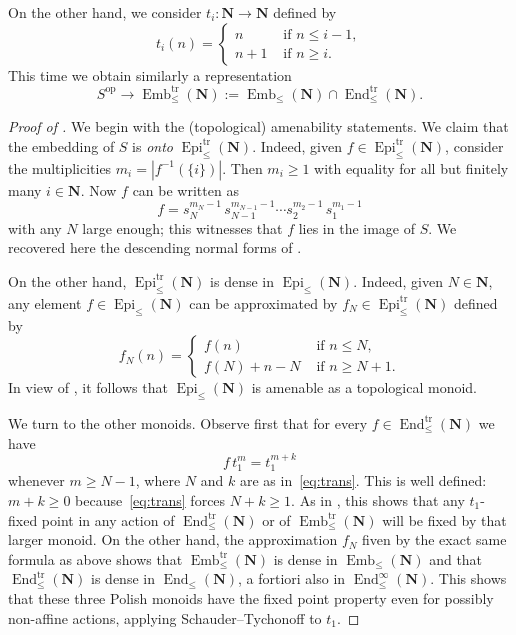 \documentclass[12pt, pdflatex]{amsart}
\theoremstyle{definition}
\numberwithin{equation}{section}
\numberwithin{theorem}{section}
\newcommand{\NN}{\mathbf{N}}
\DeclareMathOperator{\End}{End}
\DeclareMathOperator{\Emb}{Emb}
\DeclareMathOperator{\Epi}{Epi}
\begin{document}
On the other hand, we consider  $t_i\colon \NN\to \NN$ defined by
\begin{equation*}
 t_i(n) = 
    \begin{cases}
        n &\text{ if } n \leq i-1, \\
        n+1 &\text{ if } n \geq i.
    \end{cases}
\end{equation*}
This time we obtain similarly a representation
\begin{equation*}
S^\mathrm{op} \longrightarrow \Emb_\leq^\mathrm{tr}(\NN) := \Emb_\leq(\NN) \cap \End_\leq^\mathrm{tr}(\NN).
\end{equation*}

\begin{proof}[Proof of ]
We begin with the (topological) amenability statements. We claim that the embedding of $S$ is \emph{onto} $\Epi_\leq^\mathrm{tr}(\NN)$. Indeed, given $f\in \Epi_\leq^\mathrm{tr}(\NN)$, consider the multiplicities $m_i=|f^{-1}(\{i\})|$. Then $m_i\geq 1$ with equality for all but finitely many $i\in\NN$. Now $f$ can be written as
\begin{equation*}
f =   s_N^{m_N -1} \,  s_{N-1}^{m_{N-1} -1}  \cdots  s_2 ^{m_2 -1}  \,  s_1^{m_1 -1} 
\end{equation*}
with any $N$ large enough; this witnesses that $f$ lies in the image of $S$. We recovered here the descending normal forms of .

On the other hand, $\Epi_\leq^\mathrm{tr}(\NN)$ is dense in $\Epi_\leq(\NN)$. Indeed, given $N\in \NN$, any element $f\in \Epi_\leq(\NN)$ can be approximated by $f_N\in \Epi_\leq^\mathrm{tr}(\NN)$ defined by
\begin{equation*}
 f_N(n) = 
    \begin{cases}
        f(n) &\text{ if } n \leq N, \\
        f(N) + n-N &\text{ if } n \geq N+1.
    \end{cases}
\end{equation*}
In view of , it follows that $\Epi_\leq(\NN)$ is amenable as a topological monoid. 

We turn to the other monoids. Observe first that for every $f\in \End_\leq^\mathrm{tr}(\NN)$ we have
\begin{equation*}
f \, t_1^{m} = t_1^{m+k}
\end{equation*}
whenever $m\geq N-1$, where $N$ and $k$ are as in~\eqref{eq:trans}. This is well defined: $m+k\geq 0$ because~\eqref{eq:trans} forces $N+k\geq 1$. As in , this shows that any $t_1$-fixed point in any action of $\End_\leq^\mathrm{tr}(\NN)$ or of $\Emb_\leq^\mathrm{tr}(\NN)$ will be fixed by that larger monoid. On the other hand, the approximation $f_N$ fiven by the exact same formula as above shows that $\Emb_\leq^\mathrm{tr}(\NN)$ is dense in $\Emb_\leq(\NN)$ and that $\End_\leq^\mathrm{tr}(\NN)$ is dense in $\End_\leq(\NN)$, a fortiori also in $\End_\leq^\infty(\NN)$. This shows that these three Polish monoids have the fixed point property even for possibly non-affine actions, applying Schauder--Tychonoff to $t_1$.


\end{proof}
\end{document}
